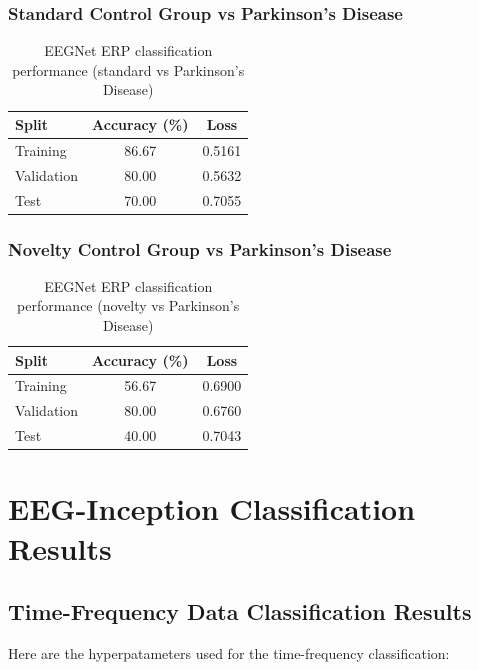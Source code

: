 \documentclass[12pt]{report}
\begin{document}
\subsubsection{Standard Control Group vs Parkinson's Disease}

\begin{table}[h]
\centering
\caption{EEGNet ERP classification performance (standard vs Parkinson's Disease)}
\begin{tabular}{lcc}
\hline
	\textbf{Split} & \textbf{Accuracy (\%)} & \textbf{Loss} \\
\hline
Training & 86.67 & 0.5161 \\
Validation & 80.00 & 0.5632 \\
Test & 70.00 & 0.7055 \\
\hline
\end{tabular}
\end{table}



\subsubsection{Novelty Control Group vs Parkinson's Disease}

\begin{table}[h]
\centering
\caption{EEGNet ERP classification performance (novelty vs Parkinson's Disease)}
\begin{tabular}{lcc}
\hline
  \textbf{Split} & \textbf{Accuracy (\%)} & \textbf{Loss} \\
\hline
Training & 56.67 & 0.6900 \\
Validation & 80.00 & 0.6760 \\
Test & 40.00 & 0.7043 \\
\hline
\end{tabular}
\end{table}



\section{EEG-Inception Classification Results}

\subsection{Time-Frequency Data Classification Results}
Here are the hyperpatameters used for the time-frequency classification:
\end{document}
